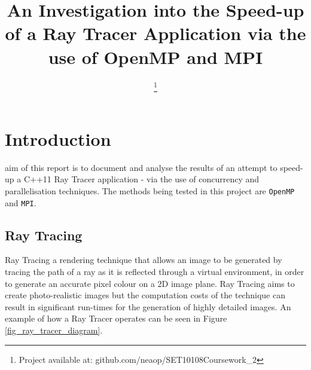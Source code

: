 \documentclass[journal,transmag]{IEEEtran}
\begin{document}
\title{An Investigation into the Speed-up of a Ray Tracer Application via the use of OpenMP and MPI}

\author{

\thanks{Project available at: github.com/neaop/SET10108Coursework\_2}}




\maketitle

\IEEEdisplaynontitleabstractindextext

\IEEEpeerreviewmaketitle

\section{Introduction}
 
	 aim of this report is to document and analyse the results of an attempt to speed-up a C++11 Ray Tracer application - via the use of concurrency and parallelisation techniques. The methods being tested in this project are \texttt{OpenMP} and \texttt{MPI}.
	
	\subsection{Ray Tracing}
		Ray Tracing a rendering technique that allows an image to be generated by tracing the path of a ray as it is reflected through a virtual environment, in order to generate an accurate pixel colour on a 2D image plane. Ray Tracing aims to create photo-realistic images but the computation costs of the technique can result in significant run-times for the generation of highly detailed images. An example of how a Ray Tracer operates can be seen in Figure \ref{fig_ray_tracer_diagram}.
			
\end{document}
